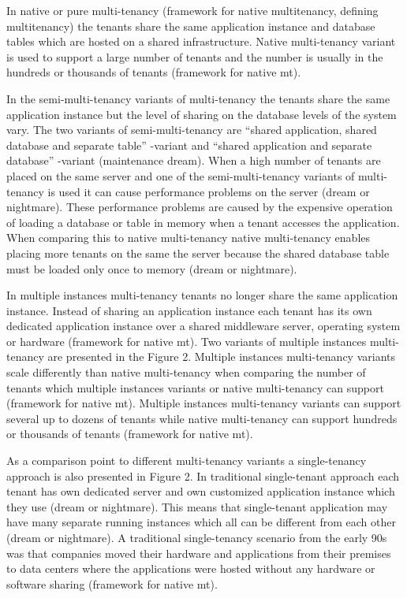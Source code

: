 \documentclass[conference]{sasmoota2017}
\begin{document}
In native or pure multi-tenancy (framework for native multitenancy, defining multitenancy) the tenants share the same application instance and database tables which are hosted on a shared infrastructure. Native multi-tenancy variant is used to support a large number of tenants and the number is usually in the hundreds or thousands of tenants (framework for native mt). 

In the semi-multi-tenancy variants of multi-tenancy the tenants share the same application instance but the level of sharing on the database levels of the system vary. The two variants of semi-multi-tenancy are “shared application, shared database and separate table” -variant and “shared application and separate database” -variant (maintenance dream). When a high number of tenants are placed on the same server and one of the semi-multi-tenancy variants of multi-tenancy is used it can cause performance problems on the server (dream or nightmare). These performance problems are caused by the expensive operation of loading a database or table in memory when a tenant accesses the application. When comparing this to native multi-tenancy native multi-tenancy enables placing more tenants on the same the server because the shared database table must be loaded only once to memory (dream or nightmare).

In multiple instances multi-tenancy tenants no longer share the same application instance. Instead of sharing an application instance each tenant has its own dedicated application instance over a shared middleware server, operating system or hardware (framework for native mt). Two variants of multiple instances multi-tenancy are presented in the Figure 2. Multiple instances multi-tenancy variants scale differently than native multi-tenancy when comparing the number of tenants which multiple instances variants or native multi-tenancy can support (framework for native mt). Multiple instances multi-tenancy variants can support several up to dozens of tenants while native multi-tenancy can support hundreds or thousands of tenants (framework for native mt).

As a comparison point to different multi-tenancy variants a single-tenancy approach is also presented in Figure 2. In traditional single-tenant approach each tenant has own dedicated server and own customized application instance which they use (dream or nightmare). This means that single-tenant application may have many separate running instances which all can be different from each other (dream or nightmare). A traditional single-tenancy scenario from the early 90s was that companies moved their hardware and applications from their premises to data centers where the applications were hosted without any hardware or software sharing (framework for native mt). 
\end{document}
